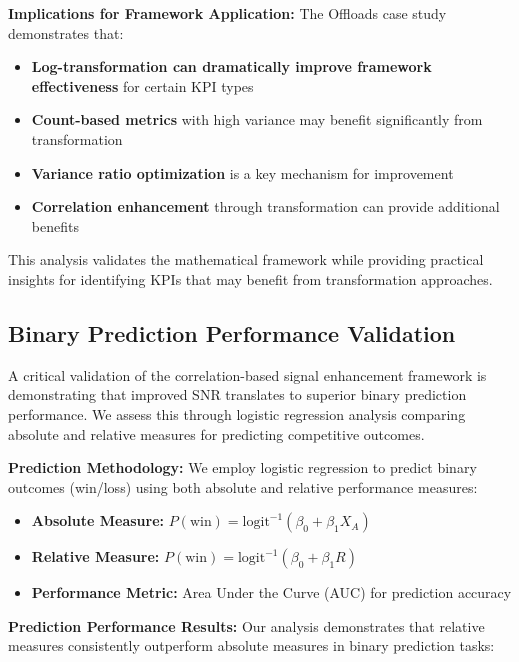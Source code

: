 \textbf{Implications for Framework Application:}
The Offloads case study demonstrates that:

\begin{itemize}
    \item \textbf{Log-transformation can dramatically improve framework effectiveness} for certain KPI types
    \item \textbf{Count-based metrics} with high variance may benefit significantly from transformation
    \item \textbf{Variance ratio optimization} is a key mechanism for improvement
    \item \textbf{Correlation enhancement} through transformation can provide additional benefits
\end{itemize}

This analysis validates the mathematical framework while providing practical insights for identifying KPIs that may benefit from transformation approaches.

\subsection{Binary Prediction Performance Validation}

A critical validation of the correlation-based signal enhancement framework is demonstrating that improved SNR translates to superior binary prediction performance. We assess this through logistic regression analysis comparing absolute and relative measures for predicting competitive outcomes.

\textbf{Prediction Methodology:}
We employ logistic regression to predict binary outcomes (win/loss) using both absolute and relative performance measures:

\begin{itemize}
    \item \textbf{Absolute Measure:} $P(\text{win}) = \text{logit}^{-1}(\beta_0 + \beta_1 X_A)$
    \item \textbf{Relative Measure:} $P(\text{win}) = \text{logit}^{-1}(\beta_0 + \beta_1 R)$
    \item \textbf{Performance Metric:} Area Under the Curve (AUC) for prediction accuracy
\end{itemize}

\textbf{Prediction Performance Results:}
Our analysis demonstrates that relative measures consistently outperform absolute measures in binary prediction tasks:

